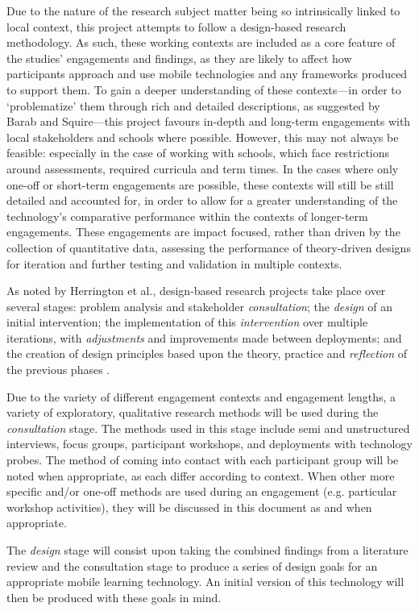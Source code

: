 Due to the nature of the research subject matter being so intrinsically linked to local context, this project attempts to follow a design-based research methodology. As such, these working contexts are included as a core feature of the studies' engagements and findings, as they are likely to affect how participants approach and use mobile technologies and any frameworks produced to support them. To gain a deeper understanding of these contexts---in order to `problematize' them through rich and detailed descriptions, as suggested by Barab and Squire---this project favours in-depth and long-term engagements with local stakeholders and schools where possible. However, this may not always be feasible: especially in the case of working with schools, which face restrictions around assessments, required curricula and term times. In the cases where only one-off or short-term engagements are possible, these contexts will still be still detailed and accounted for, in order to allow for a greater understanding of the technology's comparative performance within the contexts of longer-term engagements. These engagements are impact focused, rather than driven by the collection of quantitative data, assessing the performance of theory-driven designs for iteration and further testing and validation in multiple contexts.

As noted by Herrington et al., design-based research projects take place over several stages: problem analysis and stakeholder \textit{consultation}; the \textit{design} of an initial intervention; the implementation of this \textit{intervention} over multiple iterations, with \textit{adjustments} and improvements made between deployments; and the creation of design principles based upon the theory, practice and \textit{reflection} of the previous phases \citep{herrington2009}. 

Due to the variety of different engagement contexts and engagement lengths, a variety of exploratory, qualitative research methods will be used during the \textit{consultation} stage. The methods used in this stage include semi and unstructured interviews, focus groups, participant workshops, and deployments with technology probes. The method of coming into contact with each participant group will be noted when appropriate, as each differ according to context. When other more specific and/or one-off methods are used during an engagement (e.g. particular workshop activities), they will be discussed in this document as and when appropriate. 

The \textit{design} stage will consist upon taking the combined findings from a literature review and the consultation stage to produce a series of design goals for an appropriate mobile learning technology. An initial version of this technology will then be produced with these goals in mind. 

